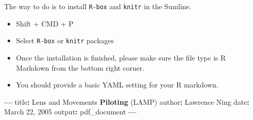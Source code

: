 \documentclass[]{book}
\newenvironment{Shaded}{\begin{snugshade}}{\end{snugshade}}
\newcommand{\DecValTok}[1]{\textcolor[rgb]{0.00,0.00,0.81}{#1}}
\newcommand{\KeywordTok}[1]{\textcolor[rgb]{0.13,0.29,0.53}{\textbf{#1}}}
\newcommand{\NormalTok}[1]{#1}
\newcommand{\OperatorTok}[1]{\textcolor[rgb]{0.81,0.36,0.00}{\textbf{#1}}}
\newcommand{\StringTok}[1]{\textcolor[rgb]{0.31,0.60,0.02}{#1}}
\providecommand{\tightlist}{%
  \setlength{\itemsep}{0pt}\setlength{\parskip}{0pt}}
\begin{document}
The way to do is to install \texttt{R-box} and \texttt{knitr} in the Sumline.

\begin{itemize}
\tightlist
\item
  Shift + CMD + P
\item
  Select \texttt{R-box} or \texttt{knitr} packages
\item
  Once the installation is finished, please make sure the file type is R Markdown from the bottom right corner.
\item
  You should provide a basic YAML setting for your R markdown.
\end{itemize}

\begin{Shaded}
\begin{Highlighting}[]
\OperatorTok{---}
\NormalTok{title}\OperatorTok{:}\StringTok{ }\NormalTok{Lens and Movements }\KeywordTok{Piloting}\NormalTok{ (LAMP)}
\NormalTok{author}\OperatorTok{:}\StringTok{ }\NormalTok{Lawrence Ning}
\NormalTok{date}\OperatorTok{:}\StringTok{ }\NormalTok{March }\DecValTok{22}\NormalTok{, }\DecValTok{2005}
\NormalTok{output}\OperatorTok{:}\StringTok{ }\NormalTok{pdf_document}
\OperatorTok{---}\StringTok{ }
\end{Highlighting}
\end{Shaded}


\end{document}
